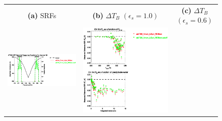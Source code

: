 \begin{figure}[H]
  \centering
  \begin{tabular}{c c c}
    \textsf{\textbf{(a)} SRFs} &
    \textsf{\textbf{(b)} $\Delta T_B$ $(\epsilon_s = 1.0)$} &
    \textsf{\textbf{(c)} $\Delta T_B$ $(\epsilon_s = 0.6)$} \\
    \includegraphics[bb=80 400 280 558,clip,scale=0.85]{graphics/srf/Rset/atms_npp.ch19.osrf.eps} &
    \includegraphics[bb=85 400 260 558,clip,scale=0.85]{graphics/dtb/Rset/e1.0_r0.0/atms_npp.ch19.dTb.eps} & 

\end{tabular}
\end{figure}
